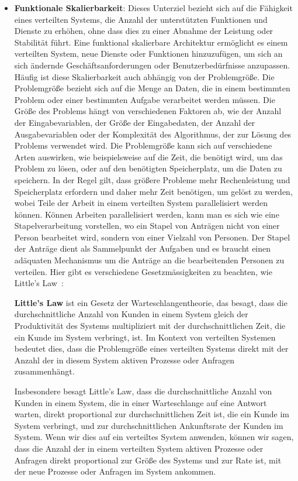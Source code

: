 \begin{itemize}
\item \textbf{Funktionale Skalierbarkeit}: Dieses Unterziel bezieht sich auf die Fähigkeit eines verteilten Systems, die Anzahl der unterstützten Funktionen und Dienste zu erhöhen, ohne dass dies zu einer Abnahme der Leistung oder Stabilität führt. Eine funktional skalierbare Architektur ermöglicht es einem verteilten System, neue Dienste oder Funktionen hinzuzufügen, um sich an sich ändernde Geschäftsanforderungen oder Benutzerbedürfnisse anzupassen. Häufig ist diese Skalierbarkeit auch abhängig von der Problemgröße. Die Problemgröße bezieht sich auf die Menge an Daten, die in einem bestimmten Problem oder einer bestimmten Aufgabe verarbeitet werden müssen. Die Größe des Problems hängt von verschiedenen Faktoren ab, wie der Anzahl der Eingabevariablen, der Größe der Eingabedaten, der Anzahl der Ausgabevariablen oder der Komplexität des Algorithmus, der zur Lösung des Problems verwendet wird. Die Problemgröße kann sich auf verschiedene Arten auswirken, wie beispielsweise auf die Zeit, die benötigt wird, um das Problem zu lösen, oder auf den benötigten Speicherplatz, um die Daten zu speichern. In der Regel gilt, dass größere Probleme mehr Rechenleistung und Speicherplatz erfordern und daher mehr Zeit benötigen, um gelöst zu werden, wobei Teile der Arbeit in einem verteilten System parallelisiert werden können. Können Arbeiten parallelisiert werden, kann man es sich wie eine Stapelverarbeitung vorstellen, wo ein Stapel von Anträgen nicht von einer Person bearbeitet wird, sondern von einer Vielzahl von Personen. Der Stapel der Anträge dient als Sammelpunkt der Aufgaben und es braucht einen adäquaten Mechanismus um die Anträge an die bearbeitenden Personen zu verteilen. Hier gibt es verschiedene Gesetzmässigkeiten zu beachten, wie Little's Law~\cite{little1961proof}:

\textbf{Little's Law} ist ein Gesetz der Warteschlangentheorie, das besagt, dass die durchschnittliche Anzahl von Kunden in einem System gleich der Produktivität des Systems multipliziert mit der durchschnittlichen Zeit, die ein Kunde im System verbringt, ist. Im Kontext von verteilten Systemen bedeutet dies, dass die Problemgröße eines verteilten Systems direkt mit der Anzahl der in diesem System aktiven Prozesse oder Anfragen zusammenhängt.

Insbesondere besagt Little's Law, dass die durchschnittliche Anzahl von Kunden in einem System, die in einer Warteschlange auf eine Antwort warten, direkt proportional zur durchschnittlichen Zeit ist, die ein Kunde im System verbringt, und zur durchschnittlichen Ankunftsrate der Kunden im System. Wenn wir dies auf ein verteiltes System anwenden, können wir sagen, dass die Anzahl der in einem verteilten System aktiven Prozesse oder Anfragen direkt proportional zur Größe des Systems und zur Rate ist, mit der neue Prozesse oder Anfragen im System ankommen.


\end{itemize}

